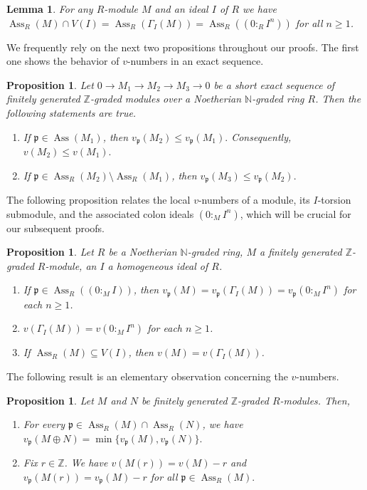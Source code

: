 \documentclass[11pt,reqno]{amsart}
\newtheorem{lemma}[theorem]{Lemma}
\newtheorem{proposition}[theorem]{Proposition}
\theoremstyle{definition}
\newcommand{\p}{\mathfrak{p}}
\newcommand{\Z}{\mathbb{Z}}
\newcommand{\N}{\mathbb{N}}
\newcommand{\Ass}{\operatorname{Ass}}
\begin{document}
\begin{lemma}\cite[Lemma 2.5]{GNP26}\label{ass prime of gammaI}
For any $R$-module $M$ and an ideal $I$ of $R$ we have     $\Ass_R( M)\cap V(I)=\Ass_R(\Gamma_I(M))=\Ass_R((0:_RI^n))$ for all $n\geq 1$.
\end{lemma}
We frequently rely on the next two propositions throughout our proofs. The first one shows the behavior of $v$-numbers in an exact sequence.
\begin{proposition}\cite[Proposition 3.1]{GNP26}\label{v number in exact seq}
    Let $0\to M_1\to M_2 \to M_3\to 0$ be a short exact sequence of finitely generated $\Z$-graded modules over a Noetherian $\N$-graded ring $R$. Then the following statements are true.
    \begin{enumerate}[label=(\arabic*), font=\upshape]
        \item If $\p\in \Ass( M_1)$, then $v_{\p}(M_2)\leq v_{\p}(M_1).$ Consequently, $v(M_2)\leq v(M_1).$ 
        \item If $\p\in \Ass_R (M_2)\setminus\Ass_R (M_1)$, then $v_{\p}(M_3)\leq v_{\p}(M_2).$
    \end{enumerate}
\end{proposition}
The following proposition relates the local $v$-numbers of a module, its $I$-torsion submodule, and the associated colon ideals $(0:_MI^n)$, which will be crucial for our subsequent proofs.
\begin{proposition}\cite[Proposition 3.2]{GNP26}\label{v number of M and colon same}
    Let $R$ be a Noetherian $\N$-graded ring, $M$ a finitely generated $\Z$-graded $R$-module, an $I$ a homogeneous ideal of $R$.
    \begin{enumerate}[label=(\arabic*), font=\upshape]
        \item If $\p\in \Ass_R((0:_MI))$, then $v_{\p}(M)=v_{\p}(\Gamma_I(M))=v_{\p}(0:_MI^n)$ for each $n\geq 1$.
        \item $v(\Gamma_I(M))=v(0:_MI^n)$ for each $n\geq 1$.
        \item If $\Ass_R(M)\subseteq V(I)$, then $v(M)=v(\Gamma_I(M))$.
    \end{enumerate}
\end{proposition}
The following result is an elementary observation concerning the $v$-numbers.

\begin{proposition}\label{easy}
Let $M$ and $N$ be finitely generated
$\mathbb{Z}$-graded $R$-modules. Then, 
\begin{enumerate}
    \item For every
$\p \in \Ass_R (M)\cap \Ass_R (N)$,
we have $v_{\p}(M\oplus N)=\min\{v_{\p}(M),v_{\p}(N)\}.$
\item Fix $r\in \Z$. We have $v(M(r))=v(M)-r$ and $v_{\p}(M(r))=v_{\p}(M)-r$ for all $\p \in \Ass_R(M).$
\end{enumerate}
\end{proposition}
\end{document}
